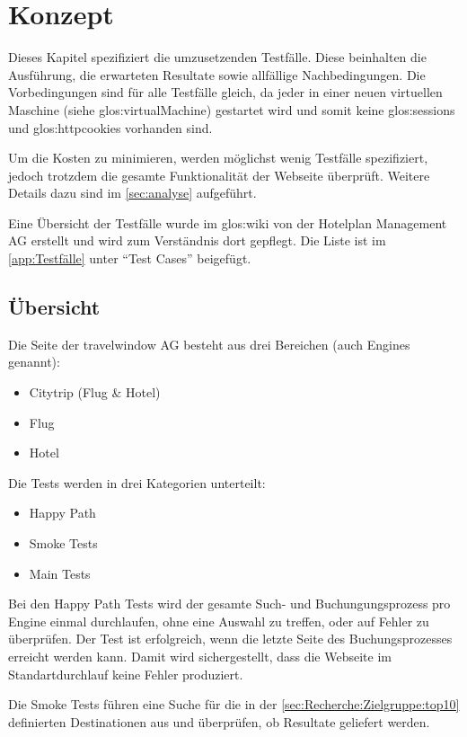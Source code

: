 
\chapter{Konzept}
\label{sec:konzept}
Dieses Kapitel spezifiziert die umzusetzenden Testfälle. Diese beinhalten die Ausführung, die erwarteten Resultate sowie allfällige Nachbedingungen. Die Vorbedingungen sind für alle Testfälle gleich, da jeder in einer neuen virtuellen Maschine (siehe \Gls{glos:virtualMachine}) gestartet wird und somit keine \Glspl{glos:session} und \Glspl{glos:httpcookie} vorhanden sind.

Um die Kosten zu minimieren, werden möglichst wenig Testfälle spezifiziert, jedoch trotzdem die gesamte Funktionalität der Webseite überprüft. Weitere Details dazu sind im \cref{sec:analyse}  aufgeführt.

Eine Übersicht der Testfälle wurde im \Gls{glos:wiki} von der Hotelplan Management AG erstellt und wird zum Verständnis dort gepflegt. Die Liste ist im \cref{app:Testfälle}  unter "`Test Cases"' beigefügt.

\section{Übersicht}
Die Seite der travelwindow AG besteht aus drei Bereichen (auch Engines genannt):
\begin{itemize}
\item Citytrip (Flug \& Hotel)
\item Flug
\item Hotel
\end{itemize}

Die Tests werden in drei Kategorien unterteilt:
\begin{itemize}
\item Happy Path
\item Smoke Tests
\item Main Tests
\end{itemize}

Bei den Happy Path Tests wird der gesamte Such- und Buchungungsprozess pro Engine einmal durchlaufen, ohne eine Auswahl zu treffen, oder auf Fehler zu überprüfen. Der Test ist erfolgreich, wenn die letzte Seite des Buchungsprozesses erreicht werden kann. Damit wird sichergestellt, dass die Webseite im Standartdurchlauf keine Fehler produziert.

Die Smoke Tests führen eine Suche für die in der \cref{sec:Recherche:Zielgruppe:top10}  definierten Destinationen aus und überprüfen, ob Resultate geliefert werden.

